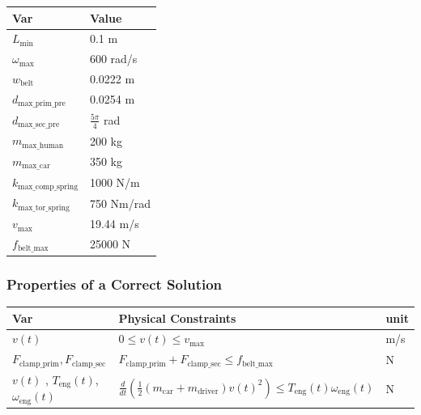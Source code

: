 \documentclass[12pt]{article}
\begin{document}
\begin{table}[H]
\caption{Specification Parameter Values} \label{TblSpecParams}
\renewcommand{\arraystretch}{1.2}
\noindent \begin{longtable*}{l l} 
  \toprule
  \textbf{Var} & \textbf{Value} \\
  \midrule 
  $L_\text{min}$ & 0.1 \si{\metre}\\
  $\omega_\text{max}$ & 600 rad/s\\
  $w_\text{belt}$ & 0.0222 m\\
  $d_\text{max\_prim\_pre}$ & 0.0254 m\\
  $d_\text{max\_sec\_pre}$ & $\frac{5\pi}{4}$ rad\\
  $m_\text{max\_human}$ & 200 kg\\
  $m_\text{max\_car}$ & 350 kg\\
  $k_\text{max\_comp\_spring}$ & 1000 N/m\\
  $k_\text{max\_tor\_spring}$ & 750 Nm/rad\\
  $v_\text{max}$ & 19.44 m/s\\
  $f_\text{belt\_max}$ & 25000 N\\
  \bottomrule
\end{longtable*}
\end{table}

\subsubsection{Properties of a Correct Solution} \label{sec_CorrectSolution}

\noindent

\begin{table}[H]
\caption{Output Variables} \label{TblOutputVar}
\renewcommand{\arraystretch}{1.2}
\noindent \begin{longtable*}{l l l} 
  \toprule
  \textbf{Var} & \textbf{Physical Constraints} & \textbf{unit}\\
  \midrule 
  $v(t)$ & $0 \leq v(t) \leq v_\text{max}$& m/s\\
  $F_{\text{clamp\_prim}}, F_{\text{clamp\_sec}}$ & $F_{\text{clamp\_prim}} + F_{\text{clamp\_sec}} \leq f_\text{belt\_max}$ & N \\
  $v(t)$ , $T_\text{eng}(t)$,  $\omega_\text{eng}(t)$ & $\frac{d}{dt}(\frac{1}{2}(m_\text{car}+m_\text{driver})v(t)^2) \leq T_\text{eng}(t) \omega_\text{eng}(t)$ & N\\
  \bottomrule
\end{longtable*}
\end{table}
\end{document}
